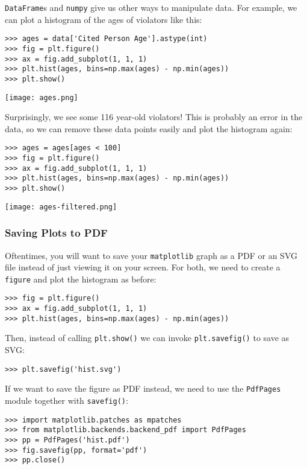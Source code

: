\texttt{DataFrame}s and \texttt{numpy} give us other ways to manipulate
data. For example, we can plot a histogram of the ages of violators like
this:

\begin{lstlisting}
>>> ages = data['Cited Person Age'].astype(int)
>>> fig = plt.figure()
>>> ax = fig.add_subplot(1, 1, 1)
>>> plt.hist(ages, bins=np.max(ages) - np.min(ages))
>>> plt.show()
\end{lstlisting}

\texttt{[image: ages.png]}

Surprisingly, we see some 116 year-old violators! This is probably an
error in the data, so we can remove these data points easily and plot
the histogram again:

\begin{lstlisting}
>>> ages = ages[ages < 100]
>>> fig = plt.figure()
>>> ax = fig.add_subplot(1, 1, 1)
>>> plt.hist(ages, bins=np.max(ages) - np.min(ages))
>>> plt.show()
\end{lstlisting}

\texttt{[image: ages-filtered.png]}

\subsubsection{Saving Plots to PDF}\label{saving-plots-to-pdf}

Oftentimes, you will want to save your \texttt{matplotlib} graph as a
PDF or an SVG file instead of just viewing it on your screen. For both,
we need to create a \texttt{figure} and plot the histogram as before:

\begin{lstlisting}
>>> fig = plt.figure()
>>> ax = fig.add_subplot(1, 1, 1)
>>> plt.hist(ages, bins=np.max(ages) - np.min(ages))
\end{lstlisting}

Then, instead of calling \texttt{plt.show()} we can invoke
\texttt{plt.savefig()} to save as SVG:

\begin{lstlisting}
>>> plt.savefig('hist.svg')
\end{lstlisting}

If we want to save the figure as PDF instead, we need to use the
\texttt{PdfPages} module together with \texttt{savefig()}:

\begin{lstlisting}
>>> import matplotlib.patches as mpatches
>>> from matplotlib.backends.backend_pdf import PdfPages   
>>> pp = PdfPages('hist.pdf')
>>> fig.savefig(pp, format='pdf')
>>> pp.close()
\end{lstlisting}

